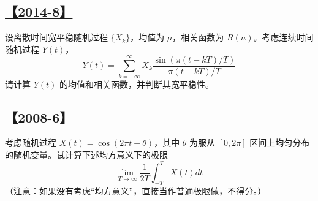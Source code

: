 \subsection{\hyperref[A2014-8]{【2014-8】}}\label{Q2014-8}

设离散时间宽平稳随机过程 $\{X_k\}$，均值为 $\mu$，相关函数为 $R(n)$。考虑连续时间随机过程 $Y(t)$，
$$
Y(t)=\sum_{k=-\infty}^\infty X_k \frac{\sin(\pi(t-kT)/T)}{\pi(t-kT)/T}
$$
请计算 $Y(t)$ 的均值和相关函数，并判断其宽平稳性。

\subsection{【2008-6】}\label{Q2008-6}

考虑随机过程 $X(t)=\cos(2\pi t+\theta)$，其中 $\theta$ 为服从 $[0, 2\pi]$ 区间上均匀分布的随机变量。试计算下述均方意义下的极限
$$
\lim_{T\rightarrow \infty}\frac{1}{2T}\int_{-T}^TX(t)dt
$$
（注意：如果没有考虑“均方意义”，直接当作普通极限做，不得分。）